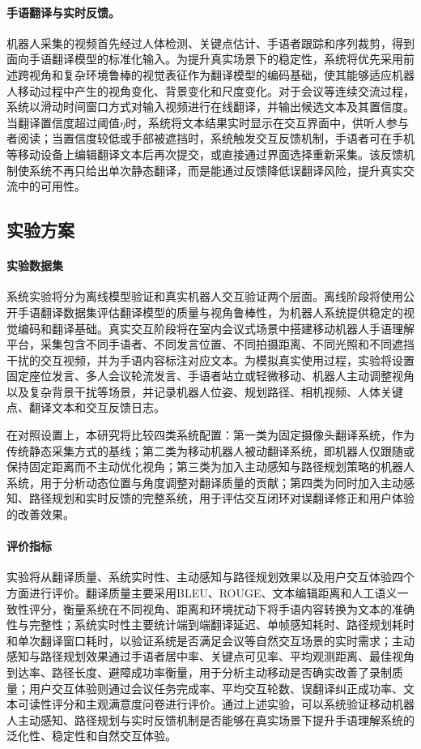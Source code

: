 \paragraph{手语翻译与实时反馈。}

机器人采集的视频首先经过人体检测、关键点估计、手语者跟踪和序列裁剪，得到面向手语翻译模型的标准化输入。为提升真实场景下的稳定性，系统将优先采用前述跨视角和复杂环境鲁棒的视觉表征作为翻译模型的编码基础，使其能够适应机器人移动过程中产生的视角变化、背景变化和尺度变化。对于会议等连续交流过程，系统以滑动时间窗口方式对输入视频进行在线翻译，并输出候选文本及其置信度。当翻译置信度超过阈值$\eta$时，系统将文本结果实时显示在交互界面中，供听人参与者阅读；当置信度较低或手部被遮挡时，系统触发交互反馈机制，手语者可在手机等移动设备上编辑翻译文本后再次提交，或直接通过界面选择重新采集。该反馈机制使系统不再只给出单次静态翻译，而是能通过反馈降低误翻译风险，提升真实交流中的可用性。

\subsection{实验方案}

\paragraph{实验数据集}

系统实验将分为离线模型验证和真实机器人交互验证两个层面。离线阶段将使用公开手语翻译数据集评估翻译模型的质量与视角鲁棒性，为机器人系统提供稳定的视觉编码和翻译基础。真实交互阶段将在室内会议式场景中搭建移动机器人手语理解平台，采集包含不同手语者、不同发言位置、不同拍摄距离、不同光照和不同遮挡干扰的交互视频，并为手语内容标注对应文本。为模拟真实使用过程，实验将设置固定座位发言、多人会议轮流发言、手语者站立或轻微移动、机器人主动调整视角以及复杂背景干扰等场景，并记录机器人位姿、规划路径、相机视频、人体关键点、翻译文本和交互反馈日志。

在对照设置上，本研究将比较四类系统配置：第一类为固定摄像头翻译系统，作为传统静态采集方式的基线；第二类为移动机器人被动翻译系统，即机器人仅跟随或保持固定距离而不主动优化视角；第三类为加入主动感知与路径规划策略的机器人系统，用于分析动态位置与角度调整对翻译质量的贡献；第四类为同时加入主动感知、路径规划和实时反馈的完整系统，用于评估交互闭环对误翻译修正和用户体验的改善效果。

\paragraph{评价指标}

实验将从翻译质量、系统实时性、主动感知与路径规划效果以及用户交互体验四个方面进行评价。翻译质量主要采用BLEU、ROUGE、文本编辑距离和人工语义一致性评分，衡量系统在不同视角、距离和环境扰动下将手语内容转换为文本的准确性与完整性；系统实时性主要统计端到端翻译延迟、单帧感知耗时、路径规划耗时和单次翻译窗口耗时，以验证系统是否满足会议等自然交互场景的实时需求；主动感知与路径规划效果通过手语者居中率、关键点可见率、平均观测距离、最佳视角到达率、路径长度、避障成功率衡量，用于分析主动移动是否确实改善了录制质量；用户交互体验则通过会议任务完成率、平均交互轮数、误翻译纠正成功率、文本可读性评分和主观满意度问卷进行评价。通过上述实验，可以系统验证移动机器人主动感知、路径规划与实时反馈机制是否能够在真实场景下提升手语理解系统的泛化性、稳定性和自然交互体验。
